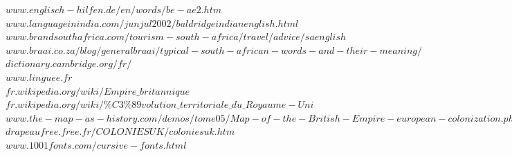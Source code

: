 \documentclass[11pt, a4paper]{report}
\begin{document}
$www.englisch-hilfen.de/en/words/be-ae2.htm$\\

$www.languageinindia.com/junjul2002/baldridgeindianenglish.html$\\

$www.brandsouthafrica.com/tourism-south-africa/travel/advice/saenglish$\\

$www.braai.co.za/blog/generalbraai/typical-south-african-words-and-their-meaning/$\\

$dictionary.cambridge.org/fr/$\\

$www.linguee.fr$\\

$fr.wikipedia.org/wiki/Empire\_britannique$\\

$fr.wikipedia.org/wiki/\%C3\%89volution\_territoriale\_du\_Royaume-Uni$\\

$www.the-map-as-history.com/demos/tome05/Map-of-the-British-Empire-european-colonization.php$\\

$drapeaufree.free.fr/COLONIESUK/coloniesuk.htm$\\

$www.1001fonts.com/cursive-fonts.html$\\
\end{document}
